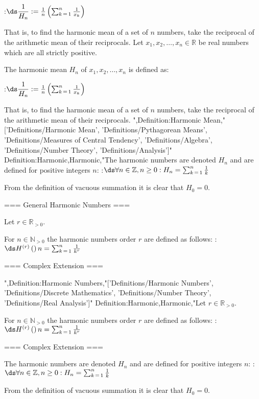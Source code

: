 :$\ds \dfrac 1 {H_n} := \frac 1 n \left( \sum_{k \mathop = 1}^n \frac 1 {x_k}  \right)$

That is, to find the harmonic mean of a set of $n$ numbers, take the reciprocal of the arithmetic mean of their reciprocals.
Let $x_1, x_2, \ldots, x_n \in \mathbb R$ be real numbers which are all strictly positive.

The harmonic mean $H_n$ of $x_1, x_2, \ldots, x_n$ is defined as:

:$\ds \dfrac 1 {H_n} := \frac 1 n \left( \sum_{k \mathop = 1}^n \frac 1 {x_k}  \right)$

That is, to find the harmonic mean of a set of $n$ numbers, take the reciprocal of the arithmetic mean of their reciprocals.
",Definition:Harmonic Mean,"['Definitions/Harmonic Mean', 'Definitions/Pythagorean Means', 'Definitions/Measures of Central Tendency', 'Definitions/Algebra', 'Definitions/Number Theory', 'Definitions/Analysis']"
Definition:Harmonic,Harmonic,"The harmonic numbers are denoted $H_n$ and are defined for positive integers $n$:
:$\ds \forall n \in \mathbb Z, n \ge 0: H_n = \sum_{k \mathop = 1}^n \frac 1 k$

From the definition of vacuous summation it is clear that $H_0 = 0$.

=== General Harmonic Numbers ===

Let $r \in \mathbb R_{>0}$.

For $n \in \mathbb N_{> 0}$ the harmonic numbers order $r$ are defined as follows:
:$\ds H^{\left( r \right)}  \left(   \right)n = \sum_{k \mathop = 1}^n \frac 1 {k^r}$


=== Complex Extension ===



",Definition:Harmonic Numbers,"['Definitions/Harmonic Numbers', 'Definitions/Discrete Mathematics', 'Definitions/Number Theory', 'Definitions/Real Analysis']"
Definition:Harmonic,Harmonic,"Let $r \in \mathbb R_{>0}$.

For $n \in \mathbb N_{> 0}$ the harmonic numbers order $r$ are defined as follows:
:$\ds H^{\left( r \right)}  \left(   \right)n = \sum_{k \mathop = 1}^n \frac 1 {k^r}$


=== Complex Extension ===



The harmonic numbers are denoted $H_n$ and are defined for positive integers $n$:
:$\ds \forall n \in \mathbb Z, n \ge 0: H_n = \sum_{k \mathop = 1}^n \frac 1 k$

From the definition of vacuous summation it is clear that $H_0 = 0$.

